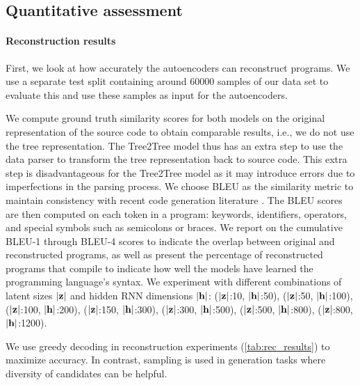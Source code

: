 \subsection{Quantitative assessment}

\paragraph{Reconstruction results}\label{sec:recon-results}
First, we look at how accurately the autoencoders can reconstruct programs. We use a separate test split containing around 60000 samples of our data set to evaluate this and use these samples as input for the autoencoders. 


We compute ground truth similarity scores for both models on the original representation of the source code to obtain comparable results, i.e., we do not use the tree representation.
The Tree2Tree model thus has an extra step to use the data parser to transform the tree representation back to source code. This extra step is disadvantageous for the Tree2Tree model as it may introduce errors due to imperfections in the parsing process. 
We choose BLEU \cite{papineniBleuMethodAutomatic2002} as the similarity metric to maintain consistency with recent code generation literature \cite[table I]{evtikhievOutBLEUHow2023}.
The BLEU scores are then computed on each token in a program: keywords, identifiers, operators, and special symbols such as semicolons or braces. 
We report on the cumulative BLEU-1 through BLEU-4 scores to indicate the overlap between original and reconstructed programs, as well as present the percentage of reconstructed programs that compile to indicate how well the models have learned the programming language's syntax. We experiment with different combinations of latent sizes $|\mathbf{z}|$ and hidden RNN dimensions $|\mathbf{h}|$:  ($|\mathbf{z}|$:10,  $|\mathbf{h}|$:50), ($|\mathbf{z}|$:50, $|\mathbf{h}|$:100), ($|\mathbf{z}|$:100, $|\mathbf{h}|$:200), ($|\mathbf{z}|$:150, $|\mathbf{h}|$:300), ($|\mathbf{z}|$:300, $|\mathbf{h}|$:500), ($|\mathbf{z}|$:500, $|\mathbf{h}|$:800), ($|\mathbf{z}|$:800, $|\mathbf{h}|$:1200).


We use greedy decoding in reconstruction experiments (\ref{tab:rec_results}) to maximize accuracy. In contrast, sampling is used in generation tasks where diversity of candidates can be helpful.

\begin{table}
\centering

\caption{Reconstruction results.}
\label{tab:rec_results}
\end{table}


